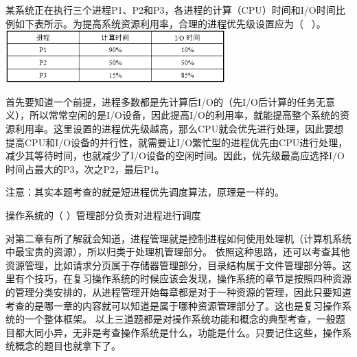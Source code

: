 \question 某系统正在执行三个进程P1、P2和P3，各进程的计算（CPU）时间和I/O时间比例如下表所示。为提高系统资源利用率，合理的进程优先级设置应为（
~）。
\includegraphics[width=3.33333in,height=0.79167in]{computerassets/DF32FF3C08A6FE076B80C8533203918A.png}
\par\fourch{}{\textcolor{red}{}}{}{}
\begin{solution}首先要知道一个前提，进程多数都是先计算后I/O的（先I/O后计算的任务无意义），所以常常空闲的是I/O设备，因此提高I/O的利用率，就能提高整个系统的资源利用率。这里设置的进程优先级越高，那么CPU就会优先进行处理，因此要想提高CPU和I/O设备的并行性，就需要让I/O繁忙型的进程优先由CPU进行处理，减少其等待时间，也就减少了I/O设备的空闲时间。因此，优先级最高应选择I/O时间占最大的P3，次之P2，最后P1。
~ ~ ~ ~~

注意：其实本题考查的就是短进程优先调度算法，原理是一样的。
\end{solution}
\question 操作系统的（ ）管理部分负责对进程进行调度
\par{}
\begin{solution}对第二章有所了解就会知道，进程管理就是控制进程如何使用处理机（计算机系统中最宝贵的资源），所以归类于处理机管理部分。
依照这种思路，还可以考查其他资源管理，比如请求分页属于存储器管理部分，目录结构属于文件管理部分等。这里有个技巧，在复习操作系统的时候应该会发现，操作系统的章节是按照四种资源的管理分类安排的，从进程管理开始每章都是对于一种资源的管理，因此只要知道考查的是哪一章的内容就可以知道是属于哪种资源管理部分了。这也是复习操作系统的一个整体框架。
以上三道题都是对操作系统功能和概念的典型考查，一般题目都大同小异，无非是考查操作系统是什么，功能是什么。只要记住这些，操作系统概念的题目也就拿下了。
\end{solution}
